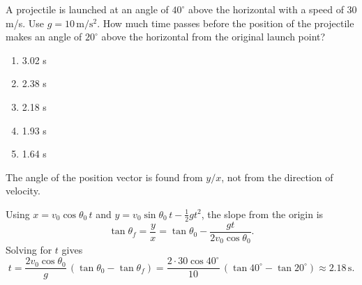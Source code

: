 \item \label{prob:39}
A projectile is launched at an angle of $40^\circ$ above the horizontal with a speed of 30 m/s. Use $g=10\,\mathrm{m/s^2}$. How much time passes before the position of the projectile makes an angle of $20^\circ$ above the horizontal from the original launch point?
\begin{enumerate}[label=(\Alph*)]
    \item 3.02 s
    \item 2.38 s
    \item 2.18 s
    \item 1.93 s
    \item 1.64 s
\end{enumerate}

\begin{answerbox}
\end{answerbox}
\begin{insightbox}
The angle of the position vector is found from $y/x$, not from the direction of velocity.
\end{insightbox}
\begin{solutionbox}
Using $x=v_0\cos\theta_0\,t$ and $y=v_0\sin\theta_0\,t-\tfrac12gt^2$, the slope from the origin is
\[
\tan\theta_f=\frac{y}{x}=\tan\theta_0-\frac{g t}{2 v_0\cos\theta_0}.
\]
Solving for $t$ gives
\[
t=\frac{2 v_0 \cos\theta_0}{g}\,(\tan\theta_0-\tan\theta_f)=\frac{2\cdot30\cos40^\circ}{10}\,(\tan40^\circ-\tan20^\circ)\approx2.18\,\text{s}.
\]
\end{solutionbox}
